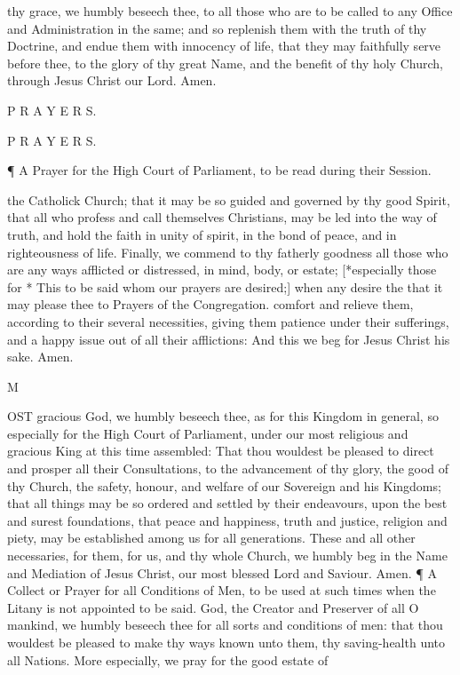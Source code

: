 thy grace, we humbly beseech thee, to all those who are to be called to any Office and Administration in the same; and so replenish them with the truth of thy Doctrine, and endue them with innocency of life, that they may faithfully serve before thee, to the glory of thy great Name, and the benefit of thy holy Church, through Jesus Christ our Lord. Amen.

P R A Y E R S.

P R A Y E R S.

¶ A Prayer for the High Court of Parliament, to be read during their Session.

the Catholick Church; that it may be so guided and governed by thy good Spirit, that all who profess and call themselves Christians, may be led into the way of truth, and hold the faith in unity of spirit, in the bond of peace, and in righteousness of life. Finally, we commend to thy fatherly goodness all those who are any ways afflicted or distressed, in mind, body, or estate; [*especially those for * This to be said whom our prayers are desired;] when any desire the that it may please thee to Prayers of the Congregation. comfort and relieve them, according to their several necessities, giving them patience under their sufferings, and a happy issue out of all their afflictions: And this we beg for Jesus Christ his sake. Amen.

M

OST gracious God, we humbly beseech thee, as for this Kingdom in general, so especially for the High Court of Parliament, under our most religious and gracious King at this time assembled: That thou wouldest be pleased to direct and prosper all their Consultations, to the advancement of thy glory, the good of thy Church, the safety, honour, and welfare of our Sovereign and his Kingdoms; that all things may be so ordered and settled by their endeavours, upon the best and surest foundations, that peace and happiness, truth and justice, religion and piety, may be established among us for all generations. These and all other necessaries, for them, for us, and thy whole Church, we humbly beg in the Name and Mediation of Jesus Christ, our most blessed Lord and Saviour. Amen. ¶ A Collect or Prayer for all Conditions of Men, to be used at such times when the Litany is not appointed to be said. God, the Creator and Preserver of all O mankind, we humbly beseech thee for all sorts and conditions of men: that thou wouldest be pleased to make thy ways known unto them, thy saving-health unto all Nations. More especially, we pray for the good estate of

